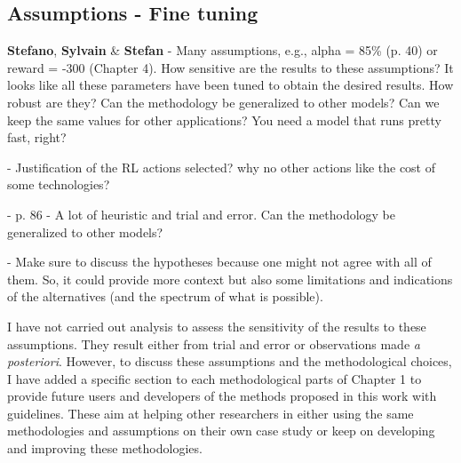 \documentclass[12pt,a4paper]{article}
\begin{document}
\subsection{Assumptions - Fine tuning}
\label{fine_tuning}

\begin{mdframed}[style=comment] %
{\color{orange} \textbf{Stefano}}, {\color{purple} \textbf{Sylvain}} \& {\color{teal} \textbf{Stefan}} - Many assumptions, e.g., alpha = 85\% (p. 40) or reward = -300 (Chapter 4). How sensitive are the results to these assumptions? It looks like all these parameters have been tuned to obtain the desired results. How robust are they? Can the methodology be generalized to other models? Can we keep the same values for other applications? You need a model that runs pretty fast, right?

 - Justification of the RL actions selected? why no other actions like the cost of some technologies?

 - p. 86 - A lot of heuristic and trial and error. Can the methodology be generalized to other models?

 - Make sure to discuss the hypotheses because one might not agree with all of them. So, it could provide more context but also some limitations and indications of the alternatives (and the spectrum of what is possible).
\end{mdframed}

\noindent I have not carried out analysis to assess the sensitivity of the results to these assumptions. They result either from trial and error or observations made \textit{a posteriori}. However, to discuss these assumptions and the methodological choices, I have added a specific section to each methodological parts of Chapter 1 to provide future users and developers of the methods proposed in this work with guidelines. These aim at helping other researchers in either using the same methodologies and assumptions on their own case study or keep on developing and improving these methodologies.
\end{document}
